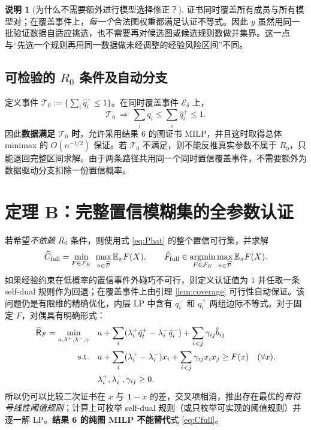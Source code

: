 \documentclass[11pt,a4paper]{ctexart}
\theoremstyle{definition}
\newtheorem{remark}[theorem]{说明}
\newcommand{\calP}{\mathcal P}
\newcommand{\calF}{\mathcal F}
\newcommand{\Ee}{\mathbb E}
\newcommand{\one}{\mathbf 1}
\newcommand{\hC}{\widehat C}
\begin{document}
\begin{remark}[为什么不需要额外进行模型选择修正？]
证书同时覆盖所有成员与所有模型对；在覆盖事件上，\emph{每一个}合法图权重都满足认证不等式。因此 $y$ 虽然用同一批验证数据自适应挑选，也不需要再对候选图或候选规则数做并集界。这一点与“先选一个规则再用同一数据做未经调整的经验风险区间”不同。
\end{remark}


\subsection{可检验的 $R_0$ 条件及自动分支}
定义事件 $\mathcal T_0:=\{\sum_i\hat q_i^+\le1\}$。在同时覆盖事件 $\mathcal E_\delta$ 上，
\begin{equation}\label{eq:testR0}
\mathcal T_0\ \Longrightarrow\ \sum_iq_i\le\sum_i\hat q_i^+\le1.
\end{equation}
因此\textbf{数据满足 $\mathcal T_0$ 时}，允许采用结果 6 的图证书 MILP，并且这时取得总体 minimax 的 $O(n^{-1/2})$ 保证。若 $\mathcal T_0$ 不满足，则不能反推真实参数不属于 $R_0$，只能退回完整区间求解。由于两条路径共用同一个同时置信覆盖事件，不需要额外为数据驱动分支扣除一份置信概率。

\section{定理 B：完整置信模糊集的全参数认证}
若希望\emph{不依赖} $R_0$ 条件，则使用式 \eqref{eq:Phat} 的整个置信可行集，并求解
\begin{equation}\label{eq:Cfull}
\hC_{\rm full}=\min_{F\in\calF_K}\ \max_{\pi\in\widehat{\calP}}\Ee_\pi F(X),
\qquad \hat F_{\rm full}\in\operatorname*{argmin}_{F\in\calF_K}\max_{\pi\in\widehat{\calP}}\Ee_\pi F(X).
\end{equation}
如果经验约束在低概率的置信事件外碰巧不可行，则定义认证值为 $1$ 并任取一条 self-dual 规则作为回退；在覆盖事件上由引理 \ref{lem:coverage} 可行性自动保证。该问题仍是有限维的精确优化，内层 LP 中含有 $q_i^-$ 和 $q_i^+$ 两组边际不等式。对于固定 $F$，对偶具有明确形式：
\begin{align}\label{eq:intervaldual}
\widehat{\mathsf R}_F=\min_{a,\lambda^+,\lambda^-,\gamma}\quad& a+\sum_i(\lambda_i^+\hat q_i^+-\lambda_i^-\hat q_i^-)+\sum_{i<j}\gamma_{ij}\hat b_{ij}\\
\text{s.t.}\quad& a+\sum_i(\lambda_i^+-\lambda_i^-)x_i+\sum_{i<j}\gamma_{ij}x_ix_j\ge F(x)\quad(\forall x),\notag\\
&\lambda_i^+,\lambda_i^-,\gamma_{ij}\ge0.\notag
\end{align}
所以仍可以比较二次证书在 $x$ 与 $\one-x$ 的差，交叉项相消，推出存在最优的\emph{有符号线性阈值规则}；计算上可枚举 self-dual 规则（或只枚举可实现的阈值规则）并逐一解 LP。\textbf{结果 6 的纯图 MILP 不能替代}式 \eqref{eq:Cfull}。
\end{document}

